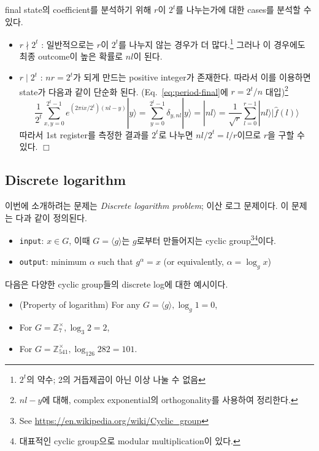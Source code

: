 final state의 coefficient를 분석하기 위해 $r$이 $2^t$를 나누는가에 대한 cases를 분석할 수 있다.
\begin{itemize}
  \item $r\nmid 2^t$ : 일반적으로는 $r$이 $2^t$를 나누지 않는 경우가 더 많다.\footnote{$2^t$의 약수; 2의 거듭제곱이 아닌 이상 나눌 수 없음} 그러나 이 경우에도 최종 outcome이 높은 확률로 $nl$이 된다. 
  \item $r\mid 2^t$ : $nr  = 2^t$가 되게 만드는 positive integer가 존재한다. 따라서 이를 이용하면 state가 다음과 같이 단순화 된다. (Eq.~\eqref{eq:period-final}에 $r=2^t/n$ 대입)\footnote{$nl - y$에 대해, complex exponential의 orthogonality를 사용하여 정리한다.}
  \begin{equation*}
    \frac{1}{2^t} \sum_{x, y=0}^{2^t-1} e^{(2 \pi i x / 2^t)(nl-y)}|y\rangle=\sum_{y=0}^{2^t-1} \delta_{y, n l}|y\rangle=|n l\rangle = \frac{1}{\sqrt{r}} \sum_{l=0}^{r-1}|n l\rangle|\hat{f}(l)\rangle
  \end{equation*}
  따라서 1st register를 측정한 결과를 $2^t$로 나누면 $nl/2^t = l/r$이므로 $r$을 구할 수 있다. $\Box$
\end{itemize}

\subsection{Discrete logarithm}
이번에 소개하려는 문제는 \textit{Discrete logarithm problem}; 이산 로그 문제이다. 이 문제는 다과 같이 정의된다.
\begin{itemize}
  \item \texttt{input}: $x \in G$, 이때 $G = \langle g \rangle$는 $g$로부터 만들어지는 cyclic group\footnote{See \url{https://en.wikipedia.org/wiki/Cyclic_group}}\footnote{대표적인 cyclic group으로 modular multiplication이 있다.}이다.
  \item \texttt{output}: minimum $\alpha$ such that $g^\alpha = x$ (or equivalently, $\alpha = \log_g x$)
\end{itemize}
\vspace{1em}
다음은 다양한 cyclic group들의 discrete log에 대한 예시이다.
\begin{itemize}
  \item (Property of logarithm) For any $G=\langle g\rangle, \log _g 1=0$,
  \item For $G=\mathbb{Z}_7^{\times}, \log _3 2=2$,
  \item For $G=\mathbb{Z}_{541}^{\times}, \log _{126} 282=101$.
\end{itemize}


